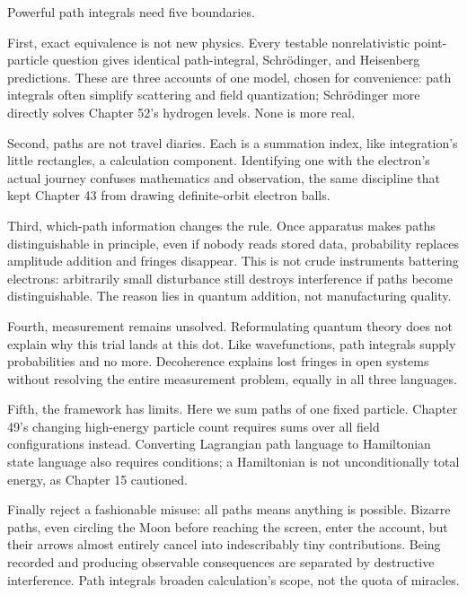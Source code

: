 
Powerful path integrals need five boundaries.

First, exact equivalence is not new physics. Every testable nonrelativistic point-particle question gives identical path-integral, Schrödinger, and Heisenberg predictions. These are three accounts of one model, chosen for convenience: path integrals often simplify scattering and field quantization; Schrödinger more directly solves Chapter 52's hydrogen levels. None is more real.

Second, paths are not travel diaries. Each is a summation index, like integration's little rectangles, a calculation component. Identifying one with the electron's actual journey confuses mathematics and observation, the same discipline that kept Chapter 43 from drawing definite-orbit electron balls.

Third, which-path information changes the rule. Once apparatus makes paths distinguishable in principle, even if nobody reads stored data, probability replaces amplitude addition and fringes disappear. This is not crude instruments battering electrons: arbitrarily small disturbance still destroys interference if paths become distinguishable. The reason lies in quantum addition, not manufacturing quality.

Fourth, measurement remains unsolved. Reformulating quantum theory does not explain why this trial lands at this dot. Like wavefunctions, path integrals supply probabilities and no more. Decoherence explains lost fringes in open systems without resolving the entire measurement problem, equally in all three languages.

Fifth, the framework has limits. Here we sum paths of one fixed particle. Chapter 49's changing high-energy particle count requires sums over all field configurations instead. Converting Lagrangian path language to Hamiltonian state language also requires conditions; a Hamiltonian is not unconditionally total energy, as Chapter 15 cautioned.

Finally reject a fashionable misuse: all paths means anything is possible. Bizarre paths, even circling the Moon before reaching the screen, enter the account, but their arrows almost entirely cancel into indescribably tiny contributions. Being recorded and producing observable consequences are separated by destructive interference. Path integrals broaden calculation's scope, not the quota of miracles.


